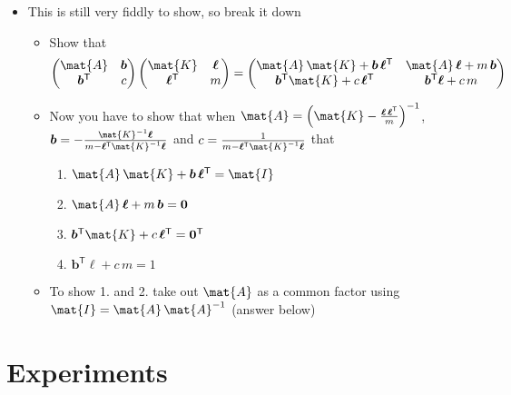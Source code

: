 \documentclass[11pt]{article}
\newcommand{\tr}{\textsf{T}}
\newcommand{\vl}{\bm{\ell}}
\newcommand{\vb}{\bm{b}}
\begin{document}
\begin{itemize}
\begin{itemize}
\item This is still very fiddly to show, so break it down
\begin{itemize}
\item Show that
$$ \begin{pmatrix} \mat{A} & \vb \\ \vb^\tr & c \end{pmatrix}
	 \begin{pmatrix} \mat{K} & \vl \\ \vl^\tr & m \end{pmatrix} =
	 \begin{pmatrix} \mat{A}\,\mat{K} + \vb\,\vl^\tr &
         \mat{A}\,\vl + m\,\vb \\ 
         \vb^\tr\mat{K} + c\,\vl^\tr & \vb^\tr \vl + c\,m \end{pmatrix} $$
\item Now you have to show that when \(\mat{A} = 
         \left(\mat{K}-\frac{\vl\,\vl^\tr}{m}\right)^{-1}\),
\(\vb=-\frac{\mat{K}^{-1} \vl}{m-\vl^\tr \mat{K}^{-1}\vl}\)
and \(c=\frac{1}{m-\vl^\tr \mat{K}^{-1}\vl}\) that
\begin{enumerate}
\item \(\mat{A}\,\mat{K} + \vb\,\vl^\tr = \mat{I}\)
\item \(\mat{A}\,\vl + m\,\vb = \bm{0}\)
\item \(\vb^\tr\mat{K} + c\,\vl^\tr = \bm{0}^\tr\)
\item \(\vb^\tr \vl + c\,m = 1\)
\end{enumerate}
\item To show 1. and 2. take out \(\mat{A}\) as a common factor using
\(\mat{I}=\mat{A}\,\mat{A}^{-1}\) (answer below)
\end{itemize}
\end{itemize}
\end{itemize}

\section{Experiments}
\label{sec:orgd904c60}
\end{document}
